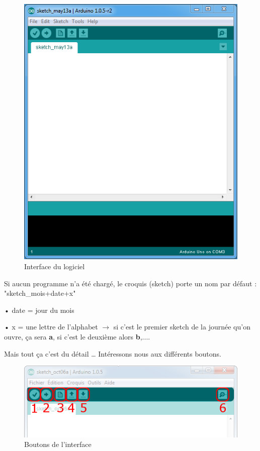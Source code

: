 \documentclass[12pt,a4paper]{article}
\begin{document}
\begin{figure}[h!]
    \centering
    \includegraphics[scale=0.7]{sketchVide.png}
    \caption{Interface du logiciel}
    \label{fig:my_label}
\end{figure}

Si aucun programme n’a été chargé, le croquis (sketch) porte un nom par défaut :
"sketch\_mois+date+x"


\begin{compactitem}
    \item[•] date  = jour du mois
    \item[•] x     = une lettre de l'alphabet $\rightarrow$ si c’est le premier sketch
    de la journée qu’on ouvre, ça sera \textbf{a}, si c’est le deuxième alors \textbf{b},....
\end{compactitem}

\newpage
Mais tout ça c’est du détail … Intéressons nous aux différents boutons.

\bigskip
\begin{figure}[h!]
    \centering
    \includegraphics[scale=1]{boutons.png}
    \caption{Boutons de l'interface}
    \label{fig:my_label}
\end{figure}
\end{document}

